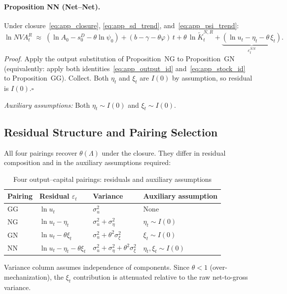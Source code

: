 \bigskip

\paragraph{Proposition NN (Net--Net).}
Under closure~\eqref{eq:app_closure}, \eqref{eq:app_sd_trend},
and~\eqref{eq:app_psi_trend}:
%
\begin{equation}
  \label{eq:app_NN}
  \ln NVA_t^R
  \;\approx\; (\ln A_0 - s_0^D - \theta\ln\psi_0)
  + (b - \gamma - \theta\varphi)\,t
  + \theta\,\ln\tilde{K}_t^{N,R}
  + \underbrace{(\ln u_t - \eta_t - \theta\,\xi_t)}_{\varepsilon_t^{NN}}.
\end{equation}
%
\emph{Proof.} Apply the output substitution of Proposition~NG to
Proposition~GN (equivalently: apply both
identities~\eqref{eq:app_output_id} and~\eqref{eq:app_stock_id} to
Proposition~GG). Collect. Both $\eta_t$ and $\xi_t$ are $I(0)$ by
assumption, so residual is $I(0)$.\hfill$\square$

\noindent\textit{Auxiliary assumptions:} Both $\eta_t \sim I(0)$ and
$\xi_t \sim I(0)$.


\subsection{Residual Structure and Pairing Selection}
\label{app:fp_comparison}

All four pairings recover $\theta(\Lambda)$ under the closure. They differ
in residual composition and in the auxiliary assumptions required:

\begin{table}[!ht]
  \centering
  \small
  \caption{Four output--capital pairings: residuals and auxiliary
    assumptions}
  \label{tab:app_four_pairings}
  \begin{tabular}{llll}
    \hline\hline
    Pairing & Residual $\varepsilon_t$ & Variance & Auxiliary assumption \\
    \hline
    GG & $\ln u_t$
      & $\sigma_u^2$
      & None \\
    NG & $\ln u_t - \eta_t$
      & $\sigma_u^2 + \sigma_\eta^2$
      & $\eta_t \sim I(0)$ \\
    GN & $\ln u_t - \theta\xi_t$
      & $\sigma_u^2 + \theta^2\sigma_\xi^2$
      & $\xi_t \sim I(0)$ \\
    NN & $\ln u_t - \eta_t - \theta\xi_t$
      & $\sigma_u^2 + \sigma_\eta^2 + \theta^2\sigma_\xi^2$
      & $\eta_t, \xi_t \sim I(0)$ \\
    \hline
  \end{tabular}
  \par\vspace{0.4em}
  \footnotesize
  Variance column assumes independence of components.
  Since $\theta < 1$ (over-mechanization), the $\xi_t$ contribution is
  attenuated relative to the raw net-to-gross variance.
\end{table}

